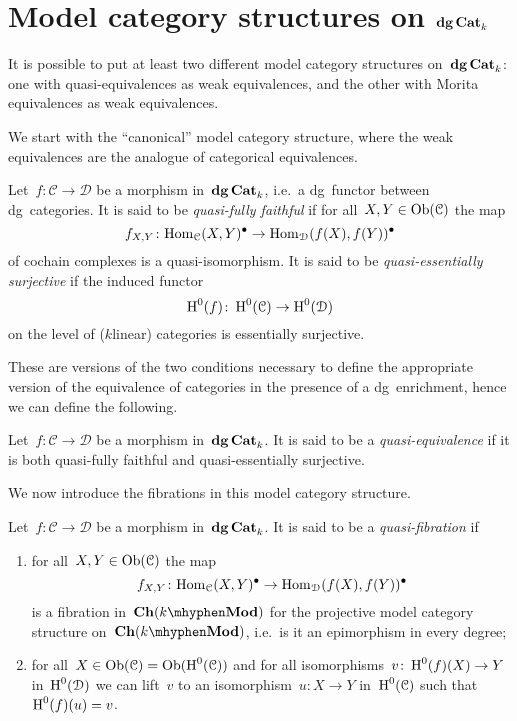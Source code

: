 \section{Model category structures on \texorpdfstring{$\mathbf{dg\,Cat}_k$}{dgCat\textunderscore k}}
It is possible to put at least two different model category structures on~$\mathbf{dg\,Cat}_k$: one with quasi-equivalences as weak equivalences, and the other with Morita equivalences as weak equivalences.

We start with the ``canonical'' model category structure, where the weak equivalences are the analogue of categorical equivalences.
\begin{definition}
  Let~$f\colon\mathcal{C}\to\mathcal{D}$ be a morphism in~$\mathbf{dg\,Cat}_k$, i.e.\ a dg~functor between dg~categories. It is said to be \emph{quasi-fully faithful} if for all~$X,Y\in\operatorname{Ob}(\mathcal{C})$ the map
  \begin{equation}
    f_{X,Y}\colon\mathrm{Hom}_{\mathcal{C}}(X,Y)^\bullet\to\mathrm{Hom}_{\mathcal{D}}(f(X),f(Y))^\bullet
  \end{equation}
  of cochain complexes is a quasi-isomorphism. It is said to be \emph{quasi-essentially surjective} if the induced functor
  \begin{equation}
    \operatorname{H}^0(f)\colon\operatorname{H}^0(\mathcal{C})\to\operatorname{H}^0(\mathcal{D})
  \end{equation}
  on the level of ($k$\dash linear) categories is essentially surjective.
\end{definition}
These are versions of the two conditions necessary to define the appropriate version of the equivalence of categories in the presence of a dg~enrichment, hence we can define the following.
\begin{definition}
  Let~$f\colon\mathcal{C}\to\mathcal{D}$ be a morphism in~$\mathbf{dg\,Cat}_k$. It is said to be a \emph{quasi-equivalence} if it is both quasi-fully faithful and quasi-essentially surjective.
\end{definition}
We now introduce the fibrations in this model category structure.
\begin{definition}
  \label{definition:quasi-fibration}
  Let~$f\colon\mathcal{C}\to\mathcal{D}$ be a morphism in~$\mathbf{dg\,Cat}_k$. It is said to be a \emph{quasi-fibration} if
  \begin{enumerate}
    \item for all~$X,Y\in\operatorname{Ob}(\mathcal{C})$ the map
      \begin{equation}
        f_{X,Y}\colon\mathrm{Hom}_{\mathcal{C}}(X,Y)^\bullet\to\mathrm{Hom}_{\mathcal{D}}(f(X),f(Y))^\bullet
      \end{equation}
      is a fibration in~$\Ch(k\mhyphen\Mod)$ for the projective model category structure on~$\Ch(k\mhyphen\Mod)$, i.e.\ is it an epimorphism in every degree;
    \item for all~$X\in\operatorname{Ob}(\mathcal{C})=\operatorname{Ob}(\operatorname{H}^0(\mathcal{C}))$ and for all isomorphisms~$v\colon\operatorname{H}^0(f)(X)\to Y$ in~$\operatorname{H}^0(\mathcal{D})$ we can lift~$v$ to an isomorphism~$u\colon X\to Y$ in~$\operatorname{H}^0(\mathcal{C})$ such that~$\operatorname{H}^0(f)(u)=v$.
  \end{enumerate}
\end{definition}

